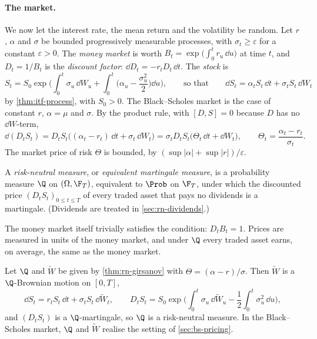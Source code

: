 \paragraph{The market.} We now let the interest rate, the mean return and the volatility be
random. Let $r$, $\alpha$ and $\sigma$ be bounded progressively measurable processes, with
$\sigma_t\ge\varepsilon$ for a constant $\varepsilon>0$. The \emph{money market} is worth
$B_t=\exp\big(\int_0^tr_u\,\dd u\big)$ at time $t$, and $D_t=1/B_t$ is the \emph{discount
factor}: $\dd D_t=-r_tD_t\,\dd t$. The \emph{stock} is
\begin{equation}\label{eq:rn-stock}
  S_t=S_0\exp\Big(\int_0^t\sigma_u\,\dd W_u+\int_0^t\Big(\alpha_u-\frac{\sigma_u^2}2\Big)\dd u\Big),
  \qquad\text{so that}\qquad \dd S_t=\alpha_tS_t\,\dd t+\sigma_tS_t\,\dd W_t
\end{equation}
by \cref{thm:itf-process}, with $S_0>0$. The Black--Scholes market is the case of constant
$r$, $\alpha=\mu$ and $\sigma$. By the product rule, with $[D,S]=0$ because $D$ has no
$\dd W$-term,
\begin{equation}\label{eq:rn-discounted-stock}
  \dd(D_tS_t)=D_tS_t\big((\alpha_t-r_t)\,\dd t+\sigma_t\,\dd W_t\big)
  =\sigma_tD_tS_t\big(\Theta_t\,\dd t+\dd W_t\big),\qquad
  \Theta_t=\frac{\alpha_t-r_t}{\sigma_t}.
\end{equation}
The market price of risk $\Theta$ is bounded, by $(\sup|\alpha|+\sup|r|)/\varepsilon$.

\begin{definition}\label{def:rn-measure}
A \emph{risk-neutral measure}, or \emph{equivalent martingale measure}, is a probability
measure $\Q$ on $(\Omega,\F_T)$, equivalent to $\Prob$ on $\F_T$, under which the discounted
price $(D_tS_t)_{0\le t\le T}$ of every traded asset that pays no dividends is a
martingale. (Dividends are treated in \cref{sec:rn-dividends}.)
\end{definition}

The money market itself trivially satisfies the condition: $D_tB_t=1$. Prices are measured in
units of the money market, and under $\Q$ every traded asset earns, on average, the same as
the money market.

\begin{proposition}\label{prop:rn-existence}
Let $\Q$ and $\widetilde W$ be given by \cref{thm:rn-girsanov} with
$\Theta=(\alpha-r)/\sigma$. Then $\widetilde W$ is a $\Q$-Brownian motion on $[0,T]$,
\[
  \dd S_t=r_tS_t\,\dd t+\sigma_tS_t\,\dd\widetilde W_t,\qquad
  D_tS_t=S_0\exp\Big(\int_0^t\sigma_u\,\dd\widetilde W_u-\frac12\int_0^t\sigma_u^2\,\dd u\Big),
\]
and $(D_tS_t)$ is a $\Q$-martingale, so $\Q$ is a risk-neutral measure. In the
Black--Scholes market, $\Q$ and $\widetilde W$ realise the setting of \cref{sec:bs-pricing}.
\end{proposition}

